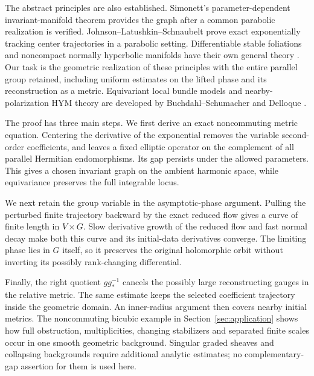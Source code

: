The abstract principles are also established. Simonett's
parameter-dependent invariant-manifold theorem \cite{simonett1994}
provides the graph after a common parabolic realization is verified.
Johnson--Latushkin--Schnaubelt \cite{jls} prove exact exponentially
tracking center trajectories in a parabolic setting. Differentiable
stable foliations and noncompact normally hyperbolic manifolds have
their own general theory \cite{psw,blz2000,blz2008}.
Our task is the geometric realization of these principles with the
entire parallel group retained, including uniform estimates on the
lifted phase and its reconstruction as a metric.
Equivariant local bundle models and nearby-polarization HYM theory
are developed by Buchdahl--Schumacher and Delloque
\cite{bs22,delloque2024,delloque2025}.

The proof has three main steps. We first derive an exact noncommuting
metric equation. Centering the derivative of the exponential removes
the variable second-order coefficients, and leaves a fixed elliptic
operator on the complement of all parallel Hermitian endomorphisms.
Its gap persists under the allowed parameters. This gives a chosen
invariant graph on the ambient harmonic space, while equivariance
preserves the full integrable locus.

We next retain the group variable in the asymptotic-phase argument.
Pulling the perturbed finite trajectory backward by the exact reduced
flow gives a curve of finite length in $V\times G$. Slow derivative
growth of the reduced flow and fast normal decay make both this curve
and its initial-data derivatives converge. The limiting phase lies
in $G$ itself, so it preserves the original holomorphic orbit without
inverting its possibly rank-changing differential.

Finally, the right quotient $gg_*^{-1}$ cancels the possibly large
reconstructing gauges in the relative metric. The same estimate
keeps the selected coefficient trajectory inside the geometric domain.
An inner-radius argument then covers nearby initial metrics.
The noncommuting bicubic example in Section~\ref{sec:application}
shows how full obstruction, multiplicities, changing stabilizers and
separated finite scales occur in one smooth geometric background.
Singular graded sheaves and collapsing backgrounds require additional
analytic estimates; no complementary-gap assertion for them is used here.
